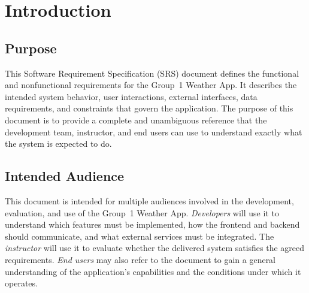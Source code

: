\documentclass[11pt,letterpaper]{article}
\begin{document}
\tableofcontents
\clearpage

\section{Introduction}

\subsection{Purpose}
This Software Requirement Specification (SRS) document defines the functional and nonfunctional requirements for the Group~1 Weather App. It describes the intended system behavior, user interactions, external interfaces, data requirements, and constraints that govern the application. The purpose of this document is to provide a complete and unambiguous reference that the development team, instructor, and end users can use to understand exactly what the system is expected to do.

\subsection{Intended Audience}
This document is intended for multiple audiences involved in the development, evaluation, and use of the Group~1 Weather App. \emph{Developers} will use it to understand which features must be implemented, how the frontend and backend should communicate, and what external services must be integrated. The \emph{instructor} will use it to evaluate whether the delivered system satisfies the agreed requirements. \emph{End users} may also refer to the document to gain a general understanding of the application's capabilities and the conditions under which it operates.
\end{document}
